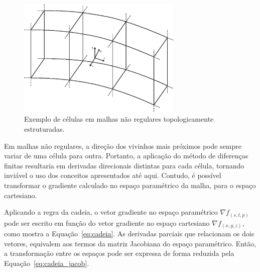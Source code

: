 \begin{figure}[h]
	\centering
	\includegraphics[width=0.7\textwidth]{images/m_irregular_cells}
	\caption{Exemplo de células em malhas não regulares topologicamente estruturadas.}
	\label{fig:m_irregular_cells}
\end{figure}

	Em malhas não regulares, a direção dos vivinhos mais próximos pode sempre variar de uma célula para outra. Portanto, a aplicação do método de diferenças finitas resultaria em derivadas direcionais distintas para cada célula, tornando inviável o uso dos conceitos apresentados até aqui. Contudo, é possível transformar o gradiente calculado no espaço paramétrico da malha, para o espaço cartesiano.
	
	Aplicando a regra da cadeia, o vetor gradiente no espaço paramétrico $ \nabla f_{(s, t, p)} $ pode ser escrito em função do vetor gradiente no espaço cartesiano $ \nabla f_{(x, y, z)} $, como mostra a Equação~\eqref{eq:cadeia}. As derivadas parciais que relacionam os dois vetores, equivalem aos termos da matriz Jacobiana do espaço paramétrico. Então, a transformação entre os espaços pode ser expressa de forma reduzida pela Equação~\eqref{eq:cadeia_jacob}.
	\\
	
